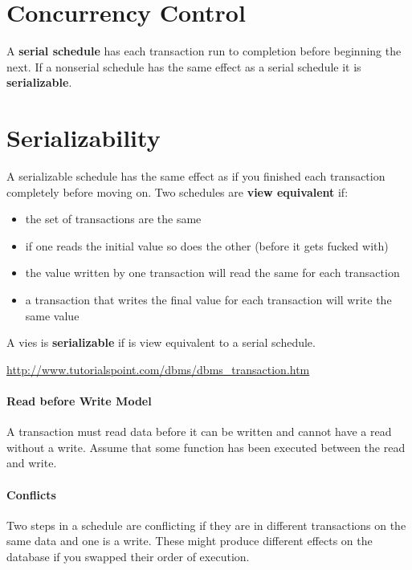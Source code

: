 \documentclass{article}
\begin{document}
\section*{Concurrency Control} %
\label{sec:concurrency_control}
A \textbf{serial schedule} has each transaction run to completion before beginning the next. If a nonserial schedule has the same effect as a serial schedule it is \textbf{serializable}.

\section*{Serializability} %
\label{sec:serializability}
A serializable schedule has the same effect as if you finished each transaction completely before moving on. Two schedules are \textbf{view equivalent} if:
\begin{itemize}
    \item the set of transactions are the same
    \item if one reads the initial value so does the other (before it gets fucked with)
    \item the value written by one transaction will read the same for each transaction
    \item a transaction that writes the final value for each transaction will write the same value
\end{itemize}
A vies is \textbf{serializable} if is view equivalent to a serial schedule.

\url{http://www.tutorialspoint.com/dbms/dbms_transaction.htm}

\paragraph{Read before Write Model} %
\label{par:read_before_write_model}
A transaction must read data before it can be written and cannot have a read without a write. Assume that some function has been executed between the read and write.

\paragraph{Conflicts} %
\label{par:conflicts}
Two steps in a schedule are conflicting if they are in different transactions on the same data and one is a write. These might produce different effects on the database if you swapped their order of execution.
\end{document}
